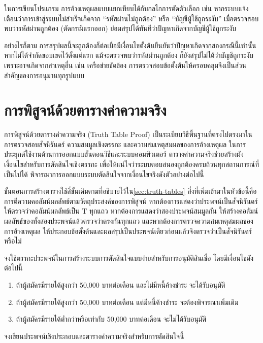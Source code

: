 ในการเขียนโปรแกรม การอ้างเหตุผลแบบแยกเทียบได้กับกลไกการตัดตัวเลือก เช่น หากระบบแจ้งเตือนว่าการเข้าสู่ระบบไม่สำเร็จเกิดจาก ``รหัสผ่านไม่ถูกต้อง'' หรือ ``บัญชีผู้ใช้ถูกระงับ'' เมื่อตรวจสอบพบว่ารหัสผ่านถูกต้อง (ตัดกรณีแรกออก) ย่อมสรุปได้ทันทีว่าปัญหาเกิดจากบัญชีผู้ใช้ถูกระงับ

อย่างไรก็ตาม การสรุปผลนี้จะถูกต้องก็ต่อเมื่อมีเงื่อนไขตั้งต้นยืนยันว่าปัญหาเกิดจากสองกรณีนี้เท่านั้น หากไม่ได้จำกัดขอบเขตไว้ตั้งแต่แรก แม้จะตรวจพบว่ารหัสผ่านถูกต้อง ก็ยังสรุปไม่ได้ว่าบัญชีถูกระงับ เพราะอาจเกิดจากสาเหตุอื่น เช่น เครือข่ายขัดข้อง การตรวจสอบข้อตั้งต้นให้ครอบคลุมจึงเป็นส่วนสำคัญของการอนุมานทุกรูปแบบ

\section{การพิสูจน์ด้วยตารางค่าความจริง}
\label{sec:truth-table-proof}

การพิสูจน์ด้วยตารางค่าความจริง (Truth Table Proof) เป็นระเบียบวิธีพื้นฐานที่ตรงไปตรงมาในการตรวจสอบสัจนิรันดร์ ความสมมูลเชิงตรรกะ และความสมเหตุสมผลของการอ้างเหตุผล ในการประยุกต์ใช้งานด้านการออกแบบขั้นตอนวิธีและระบบคอมพิวเตอร์ ตารางค่าความจริงช่วยสร้างผังเงื่อนไขสำหรับการตัดสินใจเชิงตรรกะ เพื่อให้แน่ใจว่าระบบตอบสนองถูกต้องครบถ้วนทุกสถานการณ์ที่เป็นไปได้ พิจารณาการออกแบบระบบตัดสินใจจากเงื่อนไขจริงดังตัวอย่างต่อไปนี้~\parencite{rosen2019discrete}

ขั้นตอนการสร้างตารางใช้สี่ขั้นเดิมตามที่อธิบายไว้ใน\autoref{sec:truth-tables} สิ่งที่เพิ่มเข้ามาในหัวข้อนี้คือการตีความคอลัมน์ผลลัพธ์ตามวัตถุประสงค์ของการพิสูจน์ หากต้องการแสดงว่าประพจน์เป็นสัจนิรันดร์ ให้ตรวจว่าคอลัมน์ผลลัพธ์เป็น $\text{T}$ ทุกแถว หากต้องการแสดงว่าสองประพจน์สมมูลกัน ให้สร้างคอลัมน์ผลลัพธ์ของทั้งสองประพจน์แล้วตรวจว่าตรงกันทุกแถว และหากต้องการตรวจความสมเหตุสมผลของการอ้างเหตุผล ให้ประกอบข้อตั้งต้นและผลสรุปเป็นประพจน์เดียวก่อนแล้วจึงตรวจว่าเป็นสัจนิรันดร์หรือไม่

\begin{ex}
\label{ex:decision-tree-logic}
จงใช้ตรรกะประพจน์ในการสร้างระบบการตัดสินใจแบบง่ายสำหรับการอนุมัติสินเชื่อ โดยมีเงื่อนไขดังต่อไปนี้
\begin{enumerate}
    \item ถ้าผู้สมัครมีรายได้สูงกว่า 50,000 บาทต่อเดือน และไม่มีหนี้ค้างชำระ จะได้รับอนุมัติ
    \item ถ้าผู้สมัครมีรายได้สูงกว่า 50,000 บาทต่อเดือน แต่มีหนี้ค้างชำระ จะต้องพิจารณาเพิ่มเติม
    \item ถ้าผู้สมัครมีรายได้ต่ำกว่าหรือเท่ากับ 50,000 บาทต่อเดือน จะไม่ได้รับอนุมัติ
\end{enumerate}
จงเขียนประพจน์เชิงประกอบและตารางค่าความจริงสำหรับการตัดสินใจนี้
\end{ex}

